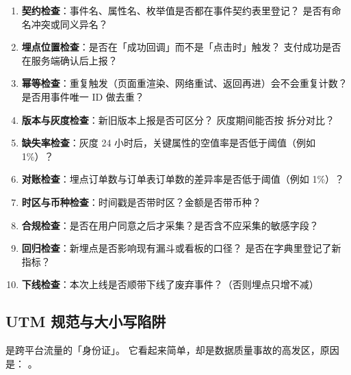 \begin{toolbox}
\begin{enumerate}
  \item \textbf{契约检查}：事件名、属性名、枚举值是否都在事件契约表里登记？
        是否有命名冲突或同义异名？
  \item \textbf{埋点位置检查}：是否在「成功回调」而不是「点击时」触发？
        支付成功是否在服务端确认后上报？
  \item \textbf{幂等检查}：重复触发（页面重渲染、网络重试、返回再进）会不会重复计数？
        是否用事件唯一 ID 做去重？
  \item \textbf{版本与灰度检查}：新旧版本上报是否可区分？
        灰度期间能否按  拆分对比？
  \item \textbf{缺失率检查}：灰度 24 小时后，关键属性的空值率是否低于阈值（例如 1\%）？
  \item \textbf{对账检查}：埋点订单数与订单表订单数的差异率是否低于阈值（例如 1\%）？
  \item \textbf{时区与币种检查}：时间戳是否带时区？金额是否带币种？
  \item \textbf{合规检查}：是否在用户同意之后才采集？是否含不应采集的敏感字段？
  \item \textbf{回归检查}：新埋点是否影响现有漏斗或看板的口径？
        是否在字典里登记了新指标？
  \item \textbf{下线检查}：本次上线是否顺带下线了废弃事件？（否则埋点只增不减）
\end{enumerate}
\end{toolbox}

\subsection{UTM 规范与大小写陷阱}

 是跨平台流量的「身份证」。
它看起来简单，却是数据质量事故的高发区，原因是：
。

